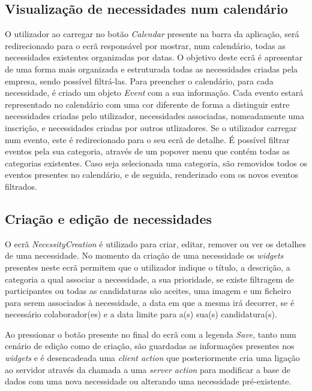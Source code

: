 \subsection{Visualização de necessidades num calendário}\label{subsec:implementacao:calendarNecessitiesView}
O utilizador ao carregar no botão \textit{Calendar} presente na barra da aplicação, será redirecionado para o ecrã responsável por mostrar, num calendário, todas as necessidades existentes organizadas por datas. 
O objetivo deste ecrã é apresentar de uma forma mais organizada e estruturada todas as necessidades criadas pela empresa, sendo possível filtrá-las. 
Para preencher o calendário, para cada necessidade, é criado um objeto \textit{Event} com a sua informação. 
Cada evento estará representado no calendário com uma cor diferente de forma a distinguir entre necessidades criadas pelo utilizador, necessidades associadas, nomeadamente uma inscrição, e necessidades criadas por outros utlizadores.
Se o utilizador carregar num evento, este é redirecionado para o seu ecrã de detalhe. 
É possível filtrar eventos pela sua categoria, através de um popover menu que contém todas as categorias existentes. 
Caso seja selecionada uma categoria, são removidos todos os eventos presentes no calendário, e de seguida, renderizado com os novos eventos filtrados.


\subsection{Criação e edição de necessidades}\label{subsec:implementacao:necessityCreation}

O ecrã \textit{NecessityCreation} é utilizado para criar, editar, remover ou ver os detalhes de uma necessidade.
No momento da criação de uma necessidade os \textit{widgets} presentes neste ecrã permitem que o utilizador indique o título, a descrição, a categoria a qual associar a necessidade, a sua prioridade, 
se existe filtragem de participantes ou todas as candidaturas são aceites, uma imagem e um ficheiro para serem associados à necessidade, a data em que a mesma irá decorrer, se é necessário colaborador(es) e a data limite para a(s) sua(s) candidatura(s).

Ao pressionar o botão presente no final do ecrã com a legenda \textit{Save}, tanto num cenário de edição como de criação, 
são guardadas as informações presentes nos \textit{widgets} e é desencadeada uma \textit{client action} que posteriormente cria uma ligação ao servidor através da chamada a uma \textit{server action} para modificar a base de dados com uma nova necessidade ou alterando uma necessidade pré-existente.

